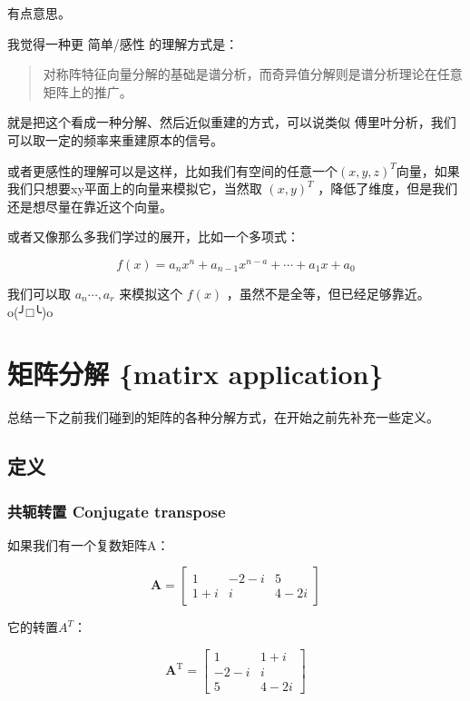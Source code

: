 \documentclass[
]{book}
\begin{document}
有点意思。

我觉得一种更 简单/感性 的理解方式是：

\begin{quote}
对称阵特征向量分解的基础是谱分析，而奇异值分解则是谱分析理论在任意矩阵上的推广。
\end{quote}

就是把这个看成一种分解、然后近似重建的方式，可以说类似 傅里叶分析，我们可以取一定的频率来重建原本的信号。

或者更感性的理解可以是这样，比如我们有空间的任意一个\((x, y, z)^T\)向量，如果我们只想要xy平面上的向量来模拟它，当然取 \((x, y)^T\) ，降低了维度，但是我们还是想尽量在靠近这个向量。

或者又像那么多我们学过的展开，比如一个多项式：

\[f(x) = a_n x^n + a_{n-1} x^{n-a} + \cdots + a_1 x + a_0\]

我们可以取 \(a_n \cdots, a_r\) 来模拟这个 \(f(x)\) ，虽然不是全等，但已经足够靠近。o(╯□╰)o

\hypertarget{ux77e9ux9635ux5206ux89e3-matirx-application}{%
\chapter{矩阵分解 \{matirx application\}}\label{ux77e9ux9635ux5206ux89e3-matirx-application}}

总结一下之前我们碰到的矩阵的各种分解方式，在开始之前先补充一些定义。

\hypertarget{ux5b9aux4e49-1}{%
\section{定义}\label{ux5b9aux4e49-1}}

\hypertarget{ux5171ux8f6dux8f6cux7f6e-conjugate-transpose}{%
\subsection{共轭转置 Conjugate transpose}\label{ux5171ux8f6dux8f6cux7f6e-conjugate-transpose}}

如果我们有一个复数矩阵A：

\[
{\displaystyle {\boldsymbol {A}}={\begin{bmatrix}1&-2-i&5\\1+i&i&4-2i\end{bmatrix}}}
\]

它的转置\(A^T\)：

\[{\displaystyle {\boldsymbol {A}}^{\mathrm {T} }={\begin{bmatrix}1&1+i\\-2-i&i\\5&4-2i\end{bmatrix}}}\]
\end{document}
